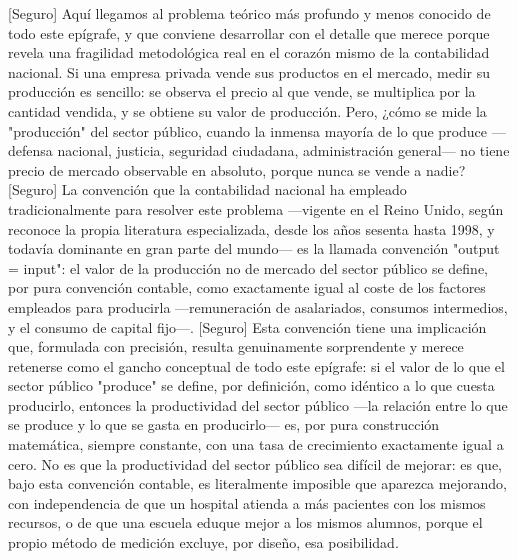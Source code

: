 \documentclass[10pt,a4paper]{article}
\begin{document}
[Seguro] Aquí llegamos al problema teórico más profundo y menos conocido de todo este epígrafe, y que conviene desarrollar con el detalle que merece porque revela una fragilidad metodológica real en el corazón mismo de la contabilidad nacional. Si una empresa privada vende sus productos en el mercado, medir su producción es sencillo: se observa el precio al que vende, se multiplica por la cantidad vendida, y se obtiene su valor de producción. Pero, ¿cómo se mide la "producción" del sector público, cuando la inmensa mayoría de lo que produce —defensa nacional, justicia, seguridad ciudadana, administración general— no tiene precio de mercado observable en absoluto, porque nunca se vende a nadie? [Seguro] La convención que la contabilidad nacional ha empleado tradicionalmente para resolver este problema —vigente en el Reino Unido, según reconoce la propia literatura especializada, desde los años sesenta hasta 1998, y todavía dominante en gran parte del mundo— es la llamada convención "output = input": el valor de la producción no de mercado del sector público se define, por pura convención contable, como exactamente igual al coste de los factores empleados para producirla —remuneración de asalariados, consumos intermedios, y el consumo de capital fijo—. [Seguro] Esta convención tiene una implicación que, formulada con precisión, resulta genuinamente sorprendente y merece retenerse como el gancho conceptual de todo este epígrafe: si el valor de lo que el sector público "produce" se define, por definición, como idéntico a lo que cuesta producirlo, entonces la productividad del sector público —la relación entre lo que se produce y lo que se gasta en producirlo— es, por pura construcción matemática, siempre constante, con una tasa de crecimiento exactamente igual a cero. No es que la productividad del sector público sea difícil de mejorar: es que, bajo esta convención contable, es literalmente imposible que aparezca mejorando, con independencia de que un hospital atienda a más pacientes con los mismos recursos, o de que una escuela eduque mejor a los mismos alumnos, porque el propio método de medición excluye, por diseño, esa posibilidad.
\end{document}
